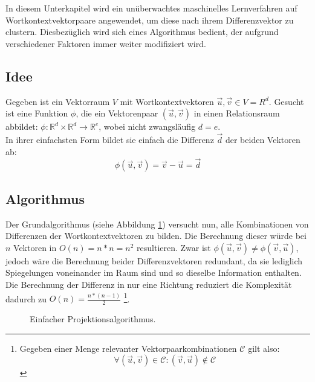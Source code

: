 In diesem Unterkapitel wird ein unüberwachtes maschinelles Lernverfahren auf Wortkontextvektorpaare angewendet, um diese
nach ihrem Differenzvektor zu clustern. Diesbezüglich wird sich eines Algorithmus bedient, der aufgrund verschiedener
Faktoren immer weiter modifiziert wird.

\subsection{Idee}

Gegeben ist ein Vektorraum $V$ mit Wortkontextvektoren $\vec{u}, \vec{v} \in V = {R}^d$.
Gesucht ist eine Funktion $\phi$, die ein Vektorenpaar $(\vec{u}, \vec{v})$ in einen Relationsraum abbildet:
$\phi: \mathbb{R}^d \times \mathbb{R}^d \to \mathbb{R}^e$, wobei
nicht zwangsläufig $d = e$.\\
In ihrer einfachsten Form bildet sie einfach die Differenz $\vec{d}$ der beiden Vektoren ab:
\begin{equation}
  \phi(\vec{u}, \vec{v}) = \vec{v} - \vec{u} = \vec{d}
\end{equation}

\subsection{Algorithmus}

Der Grundalgorithmus (siehe Abbildung \ref{fig:algo1}) versucht nun, alle Kombinationen von Differenzen der
Wortkontextvektoren zu bilden. Die Berechnung dieser würde bei $n$ Vektoren in $O(n) = n * n = n^2$ resultieren.
Zwar ist $\phi(\vec{u}, \vec{v}) \neq \phi(\vec{v}, \vec{u})$, jedoch wäre die Berechnung beider Differenzvektoren redundant,
da sie lediglich Spiegelungen voneinander im Raum sind und so dieselbe Information enthalten. Die Berechnung
der Differenz in nur eine Richtung reduziert die Komplexität dadurch zu $O(n) = \frac{n * (n-1)}{2}$
\footnote{
Gegeben einer Menge relevanter Vektorpaarkombinationen $\mathcal{C}$ gilt also:
\[
  \forall (\vec{u}, \vec{v}) \in \mathcal{C}: (\vec{v}, \vec{u}) \notin \mathcal{C}
\]
}.

\begin{figure}[h]
  \centering
  \begin{algorithm}[H]
  \end{algorithm}
  \caption[Einfacher Projektionsalgorithmus]{Einfacher Projektionsalgorithmus.\label{fig:algo1}}
\end{figure}

